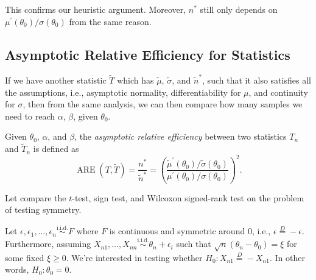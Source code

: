 \begin{remark}
	This confirms our heuristic argument. Moreover, \(n^{\ast} \) still only depends on \(\mu ^{\prime} (\theta _0) / \sigma (\theta _0)\) from the same reason.
\end{remark}

\subsection{Asymptotic Relative Efficiency for Statistics}
If we have another statistic \(\widetilde{T} \) which has \(\widetilde{\mu} \), \(\widetilde{\sigma} \), and \(\widetilde{n} ^{\ast} \), such that it also satisfies all the assumptions, i.e., asymptotic normality, differentiability for \(\mu \), and continuity for \(\sigma \), then from the same analysis, we can then compare how many samples we need to reach \(\alpha \), \(\beta \), given \(\theta _0\).

\begin{definition}\label{def:asymptotic-relative-efficiency-statistic}
	Given \(\theta _0\), \(\alpha \), and \(\beta \), the \emph{asymptotic relative efficiency} between two statistics \(T_n\) and \(\widetilde{T} _n\) is defined as
	\[
		\operatorname{ARE}(T, \widetilde{T} )
		= \frac{n^{\ast} }{\widetilde{n} ^{\ast} }
		= \left( \frac{\widetilde{\mu} ^{\prime} (\theta _0) / \widetilde{\sigma} (\theta _0)}{\mu ^{\prime} (\theta _0) / \sigma (\theta _0)} \right) ^2.
	\]
\end{definition}

Let compare the \(t\)-test, sign test, and Wilcoxon signed-rank test on the problem of testing symmetry.

\begin{problem*}
	Let \(\epsilon , \epsilon _1, \dots, \epsilon _n \overset{\text{i.i.d.} }{\sim } F\) where \(F\) is continuous and symmetric around \(0\), i.e., \(\epsilon \overset{D}{=} -\epsilon \). Furthermore, assuming \(X_{n1}, \dots , X_{nn} \overset{\text{i.i.d.} }{\sim } \theta _n + \epsilon _i\) such that \(\sqrt{n} (\theta _n - \theta _0) = \xi \) for some fixed \(\xi \geq 0\). We're interested in testing whether \(H_0 \colon X_{n1} \overset{D}{=} -X_{n1}\). In other words, \(H_0 \colon \theta _0 = 0\).
\end{problem*}

